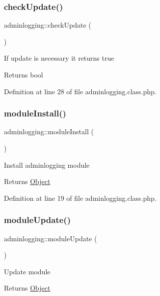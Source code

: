 \subsubsection{\texorpdfstring{check\+Update()}{checkUpdate()}}
{\footnotesize\ttfamily adminlogging\+::check\+Update (\begin{DoxyParamCaption}{ }\end{DoxyParamCaption})}

If update is necessary it returns true \begin{DoxyReturn}{Returns}
bool 
\end{DoxyReturn}


Definition at line 28 of file adminlogging.\+class.\+php.

\hypertarget{classadminlogging_a177e26010673133e8a32bcb266416ff2}{}\label{classadminlogging_a177e26010673133e8a32bcb266416ff2} 
\subsubsection{\texorpdfstring{module\+Install()}{moduleInstall()}}
{\footnotesize\ttfamily adminlogging\+::module\+Install (\begin{DoxyParamCaption}{ }\end{DoxyParamCaption})}

Install adminlogging module \begin{DoxyReturn}{Returns}
\hyperlink{classObject}{Object} 
\end{DoxyReturn}


Definition at line 19 of file adminlogging.\+class.\+php.

\hypertarget{classadminlogging_ac07c04a3d4120d487311e4a89932c705}{}\label{classadminlogging_ac07c04a3d4120d487311e4a89932c705} 
\subsubsection{\texorpdfstring{module\+Update()}{moduleUpdate()}}
{\footnotesize\ttfamily adminlogging\+::module\+Update (\begin{DoxyParamCaption}{ }\end{DoxyParamCaption})}

Update module \begin{DoxyReturn}{Returns}
\hyperlink{classObject}{Object} 
\end{DoxyReturn}


